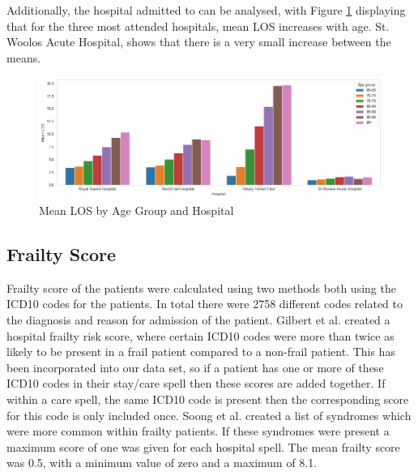 \documentclass[../thesis.tex]{subfiles}
\begin{document}
\begin{table}[h!]
    \centering
    \caption{Average LOS by Admission Day}
    \label{Tab:DayLOS}
\end{table}

Additionally, the hospital admitted to can be analysed, with Figure \ref{Fig:LOSDay} displaying that for the three most attended hospitals, mean LOS increases with age. St. Woolos Acute Hospital, shows that there is a very small increase between the means.
\begin{figure}[h!]
    \centering
    \includegraphics[width = \textwidth]{Chapter3/Figures/Mean LOS for top four hospitals in ABUHB.png}
    \caption{Mean LOS by Age Group and Hospital}
    \label{Fig:LOSDay}
\end{figure}

\subsection{Frailty Score}\label{Sec:Frailty}
Frailty score of the patients were calculated using two methods both using the ICD10 codes for the patients. In total there were 2758 different codes related to the diagnosis and reason for admission of the patient. Gilbert et al. \cite{Gilbert2018} created a hospital frailty risk score, where certain ICD10 codes were more than twice as likely to be present in a frail patient compared to a non-frail patient. This has been incorporated into our data set, so if a patient has one or more of these ICD10 codes in their stay/care spell then these scores are added together. If within a care spell, the same ICD10 code is present then the corresponding score for this code is only included once. Soong et al. \cite{Soong2015} created a list of syndromes which were more common within frailty patients. If these syndromes were present a maximum score of one was given for each hospital spell. The mean frailty score was 0.5, with a minimum value of zero and a maximum of 8.1.
\end{document}
